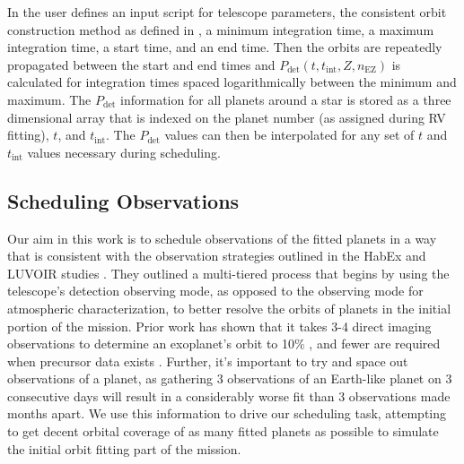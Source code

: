 
In  the user defines an  input script for
telescope parameters, the consistent orbit construction method as defined in
, a minimum integration time, a maximum integration time,
a start time, and an end time. Then the orbits are repeatedly propagated
between the start and end times and $P_{\textrm{det}}(t, t_{\textrm{int}},
Z, n_\textrm{EZ})$ is calculated for integration times spaced
logarithmically between the minimum and maximum. The $P_{\textrm{det}}$
information for all planets around a star is stored as a three dimensional
array that is indexed on the planet number (as assigned during RV fitting),
$t$, and $t_{\textrm{int}}$. The $P_\textrm{det}$ values can then be
interpolated for any set of $t$ and $t_\textrm{int}$ values necessary during
scheduling.

\subsection{Scheduling Observations}
\label{sub:scheduling}

Our aim in this work is to schedule observations of the fitted planets in a way
that is consistent with the observation strategies outlined in the HabEx and
LUVOIR studies \cite{gaudiHabitableExoplanetObservatory2020,TheLUVOIRTeam2019}.
They outlined a multi-tiered process that begins by using the telescope's
detection observing mode, as opposed to the observing mode for atmospheric
characterization, to better resolve the orbits of planets in the initial
portion of the mission. Prior work has shown that it takes 3-4 direct imaging
observations to determine an exoplanet's orbit to 10\%
\citep{bluntOrbitsImpatient2017}, and fewer are required when precursor data
exists \citep{gaudiHabitableExoplanetObservatory2020}. Further, it's important
to try and space out observations of a planet, as gathering 3 observations of
an Earth-like planet on 3 consecutive days will result in a considerably worse
fit than 3 observations made months apart. We use this information to drive our
scheduling task, attempting to get decent orbital coverage of as many fitted
planets as possible to simulate the initial orbit fitting part of the mission.

